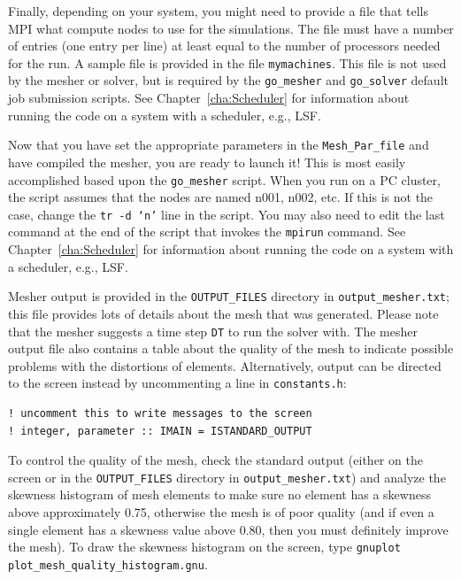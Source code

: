 Finally, depending on your system, you might need to provide a file
that tells MPI what compute nodes to use for the simulations. The
file must have a number of entries (one entry per line) at least equal
to the number of processors needed for the run. A sample file is provided
in the file \texttt{mymachines}. This file is not used by the mesher
or solver, but is required by the \texttt{go\_mesher} and \texttt{go\_solver}
default job submission scripts. See Chapter~\ref{cha:Scheduler}
for information about running the code on a system with a scheduler,
e.g., LSF.

Now that you have set the appropriate parameters in the \texttt{Mesh\_Par\_file}
and have compiled the mesher, you are ready to launch it! This is
most easily accomplished based upon the \texttt{go\_mesher} script.
When you run on a PC cluster, the script assumes that the nodes are
named n001, n002, etc. If this is not the case, change the \texttt{tr
-d `n'} line in the script. You may also need to edit the last command
at the end of the script that invokes the \texttt{mpirun} command.
See Chapter~\ref{cha:Scheduler} for information about running the
code on a system with a scheduler, e.g., LSF.

Mesher output is provided in the \texttt{OUTPUT\_FILES} directory
in \texttt{output\_mesher.txt}; this file provides lots of details
about the mesh that was generated. Please note that the mesher suggests
a time step \texttt{DT} to run the solver with. The mesher output
file also contains a table about the quality of the mesh to indicate
possible problems with the distortions of elements. Alternatively,
output can be directed to the screen instead by uncommenting a line
in \texttt{constants.h}:
\begin{verbatim}
! uncomment this to write messages to the screen
! integer, parameter :: IMAIN = ISTANDARD_OUTPUT
\end{verbatim}
To control the quality of the mesh, check the standard output (either
on the screen or in the \texttt{OUTPUT\_FILES} directory in \texttt{output\_mesher.txt})
and analyze the skewness histogram of mesh elements to make sure no
element has a skewness above approximately 0.75, otherwise the mesh
is of poor quality (and if even a single element has a skewness value
above 0.80, then you must definitely improve the mesh). To draw the
skewness histogram on the screen, type \texttt{gnuplot plot\_mesh\_quality\_histogram.gnu}.

